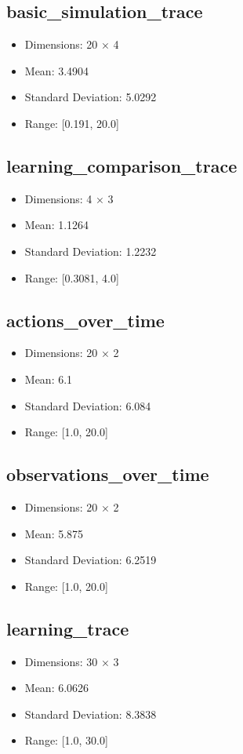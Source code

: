 \documentclass{article}
\begin{document}
\subsection{basic_simulation_trace}
\begin{itemize}
\item Dimensions: 20 × 4
\item Mean: 3.4904
\item Standard Deviation: 5.0292
\item Range: [0.191, 20.0]
\end{itemize}

\subsection{learning_comparison_trace}
\begin{itemize}
\item Dimensions: 4 × 3
\item Mean: 1.1264
\item Standard Deviation: 1.2232
\item Range: [0.3081, 4.0]
\end{itemize}

\subsection{actions_over_time}
\begin{itemize}
\item Dimensions: 20 × 2
\item Mean: 6.1
\item Standard Deviation: 6.084
\item Range: [1.0, 20.0]
\end{itemize}

\subsection{observations_over_time}
\begin{itemize}
\item Dimensions: 20 × 2
\item Mean: 5.875
\item Standard Deviation: 6.2519
\item Range: [1.0, 20.0]
\end{itemize}

\subsection{learning_trace}
\begin{itemize}
\item Dimensions: 30 × 3
\item Mean: 6.0626
\item Standard Deviation: 8.3838
\item Range: [1.0, 30.0]
\end{itemize}
\end{document}
